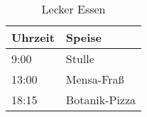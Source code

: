 \documentclass{scrartcl}
\newcommand{\zeit}[2]{#1:#2}
\begin{document}
\begin{table}[h]
  \centering
  \begin{tabular}{ll}
    \toprule
    Uhrzeit             & Speise        \\
    \midrule
    \zeit{9}{00}        & Stulle        \\
    \zeit{13}{00}       & Mensa-Fraß    \\
    \zeit{18}{15}       & Botanik-Pizza \\
  \end{tabular}
  \caption{Lecker Essen}
  \label{tab:essen}
\end{table}

\end{document}
